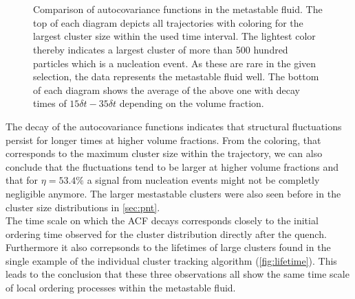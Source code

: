 \begin{figure}[ht]
\begin{center}
 \hspace{0.5cm}
 \\
 \hspace{0.5cm}
 \\
\caption[Autocovariance functions of largest cluster in the metastable fluid]{Comparison of autocovariance functions in the metastable fluid. The top of each diagram depicts all trajectories with coloring for the largest cluster size within the used time interval. The lightest color thereby indicates a largest cluster of more than 500 hundred particles which is a nucleation event. As these are rare in the given selection, the data represents the metastable fluid well. The bottom of each diagram shows the average of the above one with decay times of $ 15 \delta t- 35 \delta t$ depending on the volume fraction. }
\label{fig:acf}
\end{center}
\end{figure}

The decay of the autocovariance functions indicates that structural fluctuations persist for longer times at higher volume fractions. From the coloring, that corresponds to the maximum cluster size within the trajectory, we can also conclude that the fluctuations tend to be larger at higher volume fractions and that for $\eta=53.4\%$ a signal from nucleation events might not be completly negligible anymore. The larger mestastable clusters were also seen before in the cluster size distributions in \autoref{sec:pnt}.\\
The time scale on which the ACF decays corresponds closely to the initial ordering time observed for the cluster distribution directly after the quench. Furthermore it also correpsonds to the lifetimes of large clusters found in the single example of the individual cluster tracking algorithm (\autoref{fig:lifetime}). This leads to the conclusion that these three observations all show the same time scale of local ordering processes within the metastable fluid. 

